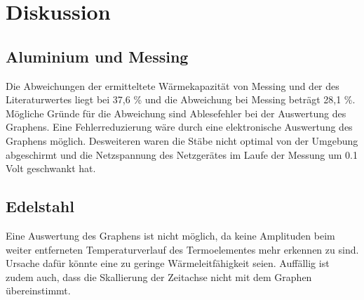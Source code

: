 \section{Diskussion}
\label{sec:Diskussion}
\subsection{Aluminium und Messing}
Die Abweichungen der ermitteltete Wärmekapazität von Messing und der des Literaturwertes liegt bei 37,6 \% und die Abweichung bei Messing beträgt 28,1 \%. Mögliche Gründe für die Abweichung sind Ablesefehler bei der Auswertung des Graphens. Eine Fehlerreduzierung wäre durch eine elektronische Auswertung des Graphens möglich. Desweiteren waren die Stäbe nicht optimal von der Umgebung abgeschirmt und die Netzspannung des Netzgerätes im Laufe der Messung um 0.1 Volt geschwankt hat.

\subsection{Edelstahl}
Eine Auswertung des Graphens ist nicht möglich, da keine Amplituden beim weiter entferneten Temperaturverlauf des Termoelementes mehr erkennen zu sind. Ursache dafür könnte eine zu geringe Wärmeleitfähigkeit seien. Auffällig ist zudem auch, dass die Skallierung der Zeitachse nicht mit dem Graphen übereinstimmt.
